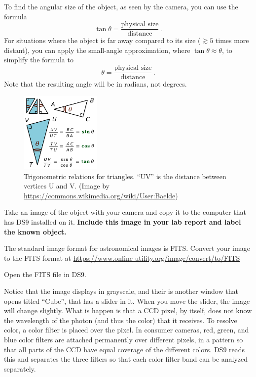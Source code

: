 \begin{steps}
	To find the angular size of the object, as seen by the camera, you can use the formula
	\begin{equation}
	 \tan \theta = \frac{\textrm{physical size}}{\textrm{distance}}\,.
	\end{equation}
	For situations where the object is far away compared to its size ($\gtrsim 5$ times more distant), you can apply the small-angle approximation, where $\tan \theta \approx \theta$, to simplify the formula to
	\begin{equation}
	 \theta = \frac{\textrm{physical size}}{\textrm{distance}}\,.
	\end{equation}
	Note that the resulting angle will be in radians, not degrees.

\begin{figure}
	\centering
	\includegraphics[width=0.35\textwidth]{astro-images-remote/1024px-Academ_Base_of_trigonometry_svg.png}
	\caption{Trigonometric relations for triangles. ``UV'' is the distance between vertices U and V. (Image by \url{https://commons.wikimedia.org/wiki/User:Baelde})}\label{ai:fig:trig}
\end{figure}

	\item Take an image of the object with your camera and copy it to the computer that has DS9 installed on it. \textbf{Include this image in your lab report and label the known object.}
	
	\item The standard image format for astronomical images is FITS. Convert your image to the FITS format at \url{https://www.online-utility.org/image/convert/to/FITS}
	
	\item Open the FITS file in DS9.

\end{steps}
	
	Notice that the image displays in grayscale, and their is another window that opens titled ``Cube'', that has a slider in it. When you move the slider, the image will change slightly. What is happen is that a CCD pixel, by itself, does not know the wavelength of the photon (and thus the color) that it receives. To resolve color, a color filter is placed over the pixel. In consumer cameras, red, green, and blue color filters are attached permanently over different pixels, in a pattern so that all parts of the CCD have equal coverage of the different colors. DS9 reads this and separates the three filters so that each color filter band can be analyzed separately.
	
